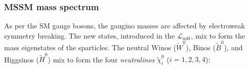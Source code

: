 




			\subsubsection*{MSSM mass spectrum}

				As per the \ac{SM} gauge bosons, the gaugino masses are affected by electroweak symmetry breaking. The new states, introduced in the $\mathcal L_{\mathrm{soft}}$, mix to form the mass eigenstates of the sparticles. The neutral Winos ($\tilde{W}^0$), Binos ($\tilde{B}^0$), and Higgsinos ($\tilde{H}^0$) mix to form the four \textit{neutralinos} $\tilde{\chi}^0_i$ ($i=1,2,3,4$):

